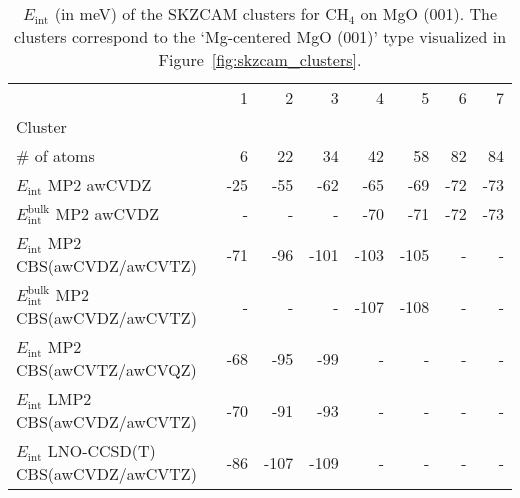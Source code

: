 
\begin{table}
\caption{\label{tab:system_eint_mgo_ch4}$E_\textrm{int}$ (in meV) of the SKZCAM clusters for CH$_4$ on MgO (001). The clusters correspond to the `Mg-centered MgO (001)' type visualized in Figure~\ref{fig:skzcam_clusters}.}
\begin{adjustbox}{center,max width=1.4\textwidth}
\begin{tabular}{lrrrrrrr}
\toprule
 & 1 & 2 & 3 & 4 & 5 & 6 & 7 \\ 
Cluster &  &  &  &  &  &  &  \\
\midrule
\# of atoms & 6 & 22 & 34 & 42 & 58 & 82 & 84 \\
$E_\textrm{int}$ MP2 awCVDZ & -25 & -55 & -62 & -65 & -69 & -72 & -73 \\
$E_\textrm{int}^\textrm{bulk}$ MP2 awCVDZ & - & - & - & -70 & -71 & -72 & -73 \\
$E_\textrm{int}$ MP2 CBS(awCVDZ/awCVTZ) & -71 & -96 & -101 & -103 & -105 & - & - \\
$E_\textrm{int}^\textrm{bulk}$ MP2 CBS(awCVDZ/awCVTZ) & - & - & - & -107 & -108 & - & - \\
$E_\textrm{int}$ MP2 CBS(awCVTZ/awCVQZ) & -68 & -95 & -99 & - & - & - & - \\
$E_\textrm{int}$ LMP2 CBS(awCVDZ/awCVTZ) & -70 & -91 & -93 & - & - & - & - \\
$E_\textrm{int}$ LNO-CCSD(T) CBS(awCVDZ/awCVTZ) & -86 & -107 & -109 & - & - & - & - \\
\bottomrule
\end{tabular}
\end{adjustbox}
\end{table}


